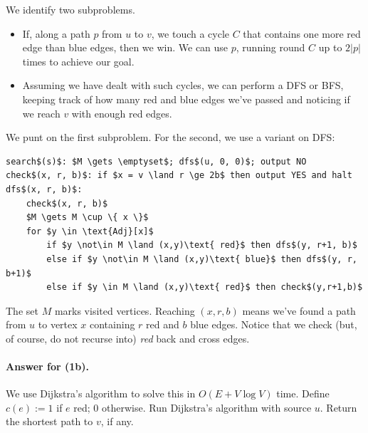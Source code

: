 \documentclass[a4paper]{article}
\begin{document}
We identify two subproblems.
\begin{itemize}
	\item If, along a path $p$ from $u$ to $v$, we touch a cycle $C$ that contains one more red edge than blue edges, then we win.
	We can use $p$, running round $C$ up to $2|p|$ times to achieve our goal.

	\item Assuming we have dealt with such cycles, we can perform a DFS or BFS, keeping track of how many red and blue edges we've passed and noticing if we reach $v$ with enough red edges.
\end{itemize}
We punt on the first subproblem.
For the second, we use a variant on DFS:
\begin{lstlisting}[numbers=none,xleftmargin=1cm]
search$(s)$: $M \gets \emptyset$; dfs$(u, 0, 0)$; output NO
check$(x, r, b)$: if $x = v \land r \ge 2b$ then output YES and halt
dfs$(x, r, b)$:
	check$(x, r, b)$
	$M \gets M \cup \{ x \}$
	for $y \in \text{Adj}[x]$
		if $y \not\in M \land (x,y)\text{ red}$ then dfs$(y, r+1, b)$
		else if $y \not\in M \land (x,y)\text{ blue}$ then dfs$(y, r, b+1)$
		else if $y \in M \land (x,y)\text{ red}$ then check$(y,r+1,b)$\end{lstlisting}
The set $M$ marks visited vertices.
Reaching $(x, r, b)$ means we've found a path from $u$ to vertex $x$ containing $r$ red and $b$ blue edges.
Notice that we check (but, of course, do not recurse into) \emph{red} back and cross edges.

\paragraph{Answer for (1b).}
We use Dijkstra's algorithm to solve this in $O(E + V \log V)$ time.
	Define $c(e) := 1$ if $e$ red; $0$ otherwise.
	Run Dijkstra's algorithm with source $u$.
	Return the shortest path to $v$, if any.
\end{document}
